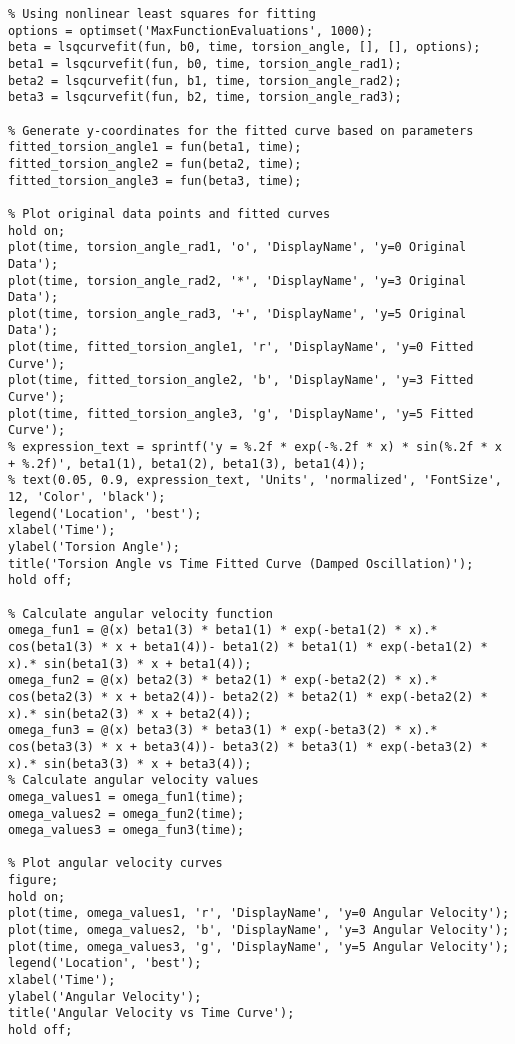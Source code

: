 \documentclass{mcmthesis}  %
\begin{document}
\begin{appendices}
\begin{verbatim}
% Using nonlinear least squares for fitting
options = optimset('MaxFunctionEvaluations', 1000);
beta = lsqcurvefit(fun, b0, time, torsion_angle, [], [], options);
beta1 = lsqcurvefit(fun, b0, time, torsion_angle_rad1);
beta2 = lsqcurvefit(fun, b1, time, torsion_angle_rad2);
beta3 = lsqcurvefit(fun, b2, time, torsion_angle_rad3);

% Generate y-coordinates for the fitted curve based on parameters
fitted_torsion_angle1 = fun(beta1, time);
fitted_torsion_angle2 = fun(beta2, time);
fitted_torsion_angle3 = fun(beta3, time);

% Plot original data points and fitted curves
hold on;
plot(time, torsion_angle_rad1, 'o', 'DisplayName', 'y=0 Original Data');
plot(time, torsion_angle_rad2, '*', 'DisplayName', 'y=3 Original Data');
plot(time, torsion_angle_rad3, '+', 'DisplayName', 'y=5 Original Data');
plot(time, fitted_torsion_angle1, 'r', 'DisplayName', 'y=0 Fitted Curve');
plot(time, fitted_torsion_angle2, 'b', 'DisplayName', 'y=3 Fitted Curve');
plot(time, fitted_torsion_angle3, 'g', 'DisplayName', 'y=5 Fitted Curve');
% expression_text = sprintf('y = %.2f * exp(-%.2f * x) * sin(%.2f * x + %.2f)', beta1(1), beta1(2), beta1(3), beta1(4));
% text(0.05, 0.9, expression_text, 'Units', 'normalized', 'FontSize', 12, 'Color', 'black');
legend('Location', 'best');
xlabel('Time');
ylabel('Torsion Angle');
title('Torsion Angle vs Time Fitted Curve (Damped Oscillation)');
hold off;

% Calculate angular velocity function
omega_fun1 = @(x) beta1(3) * beta1(1) * exp(-beta1(2) * x).* cos(beta1(3) * x + beta1(4))- beta1(2) * beta1(1) * exp(-beta1(2) * x).* sin(beta1(3) * x + beta1(4));
omega_fun2 = @(x) beta2(3) * beta2(1) * exp(-beta2(2) * x).* cos(beta2(3) * x + beta2(4))- beta2(2) * beta2(1) * exp(-beta2(2) * x).* sin(beta2(3) * x + beta2(4));
omega_fun3 = @(x) beta3(3) * beta3(1) * exp(-beta3(2) * x).* cos(beta3(3) * x + beta3(4))- beta3(2) * beta3(1) * exp(-beta3(2) * x).* sin(beta3(3) * x + beta3(4));
% Calculate angular velocity values
omega_values1 = omega_fun1(time);
omega_values2 = omega_fun2(time);
omega_values3 = omega_fun3(time);

% Plot angular velocity curves
figure;
hold on;
plot(time, omega_values1, 'r', 'DisplayName', 'y=0 Angular Velocity');
plot(time, omega_values2, 'b', 'DisplayName', 'y=3 Angular Velocity');
plot(time, omega_values3, 'g', 'DisplayName', 'y=5 Angular Velocity');
legend('Location', 'best');
xlabel('Time');
ylabel('Angular Velocity');
title('Angular Velocity vs Time Curve');
hold off;


\end{verbatim}
\end{appendices}
\end{document}
